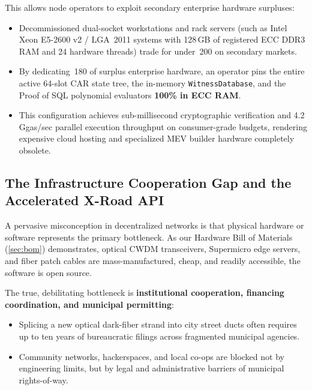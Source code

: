 \documentclass[a4paper,11pt,twoside,parskip=half-,headings=small]{scrartcl}
\newcommand{\EUR}[1]{\texteuro\,#1}
\newcommand{\code}[1]{\texttt{#1}}
\begin{document}
This allows node operators to exploit secondary enterprise hardware surpluses:
\begin{itemize}
  \item Decommissioned dual-socket workstations and rack servers (such as Intel Xeon E5-2600 v2 / LGA~2011 systems with 128\,GB of registered ECC DDR3 RAM and 24 hardware threads) trade for under \EUR{200} on secondary markets.
  \item By dedicating \EUR{180} of surplus enterprise hardware, an operator pins the entire active 64-slot CAR state tree, the in-memory \code{WitnessDatabase}, and the Proof of SQL polynomial evaluators \textbf{100\% in ECC RAM}.
  \item This configuration achieves sub-millisecond cryptographic verification and 4.2\,Ggas/sec parallel execution throughput on consumer-grade budgets, rendering expensive cloud hosting and specialized MEV builder hardware completely obsolete.
\end{itemize}

\subsection{The Infrastructure Cooperation Gap and the Accelerated X-Road API}
\label{sec:xroad_infrastructure}

A pervasive misconception in decentralized networks is that physical hardware or software
represents the primary bottleneck. As our Hardware Bill of Materials (\cref{sec:bom})
demonstrates, optical CWDM transceivers, Supermicro edge servers, and fiber patch cables are
mass-manufactured, cheap, and readily accessible, the software is open source.

The true, debilitating bottleneck is \textbf{institutional cooperation, financing coordination,
and municipal permitting}:
\begin{itemize}
  \item Splicing a new optical dark-fiber strand into city street ducts often requires up to
ten years of bureaucratic filings across fragmented municipal agencies.
  \item Community networks, hackerspaces, and local co-ops are blocked not by engineering limits,
but by legal and administrative barriers of municipal rights-of-way.
\end{itemize}
\end{document}
